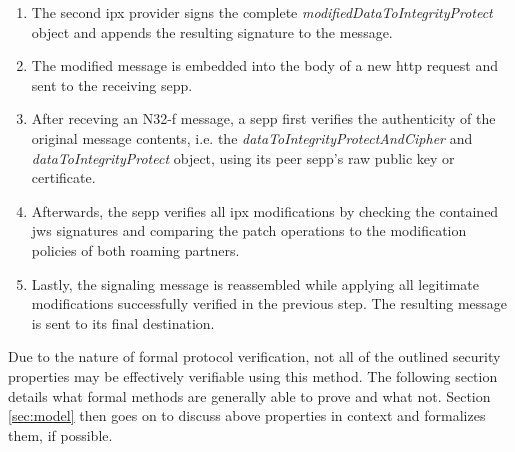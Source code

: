 \begin{enumerate}[wide, labelwidth=!, labelindent=0pt]
    \item The second \gls{ipx} provider signs the complete \textit{modifiedDataToIntegrityProtect} object and appends the resulting signature to the message.
    \item The modified message is embedded into the body of a new \gls{http} request and sent to the receiving \gls{sepp}.
    \item After receving an N32-f message, a \gls{sepp} first verifies the authenticity of the original message contents, i.e. the \textit{dataToIntegrityProtectAndCipher} and \textit{dataToIntegrityProtect} object, using its peer \gls{sepp}'s raw public key or certificate.
    \item Afterwards, the \gls{sepp} verifies all \gls{ipx} modifications by checking the contained \gls{jws} signatures and comparing the patch operations to the modification policies of both roaming partners.
    \item Lastly, the signaling message is reassembled while applying all legitimate modifications successfully verified in the previous step. The resulting message is sent to its final destination.
\end{enumerate}

Due to the nature of formal protocol verification, not all of the outlined security properties may be effectively verifiable using this method.
The following section details what formal methods are generally able to prove and what not.
Section \ref{sec:model} then goes on to discuss above properties in context and formalizes them, if possible.